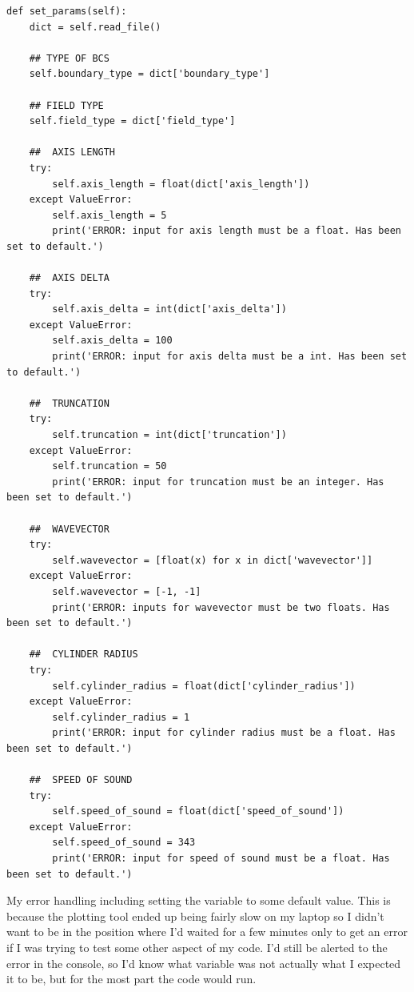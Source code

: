 \begin{lstlisting}
def set_params(self):
    dict = self.read_file()

    ## TYPE OF BCS
    self.boundary_type = dict['boundary_type']

    ## FIELD TYPE
    self.field_type = dict['field_type']

    ##  AXIS LENGTH
    try:
        self.axis_length = float(dict['axis_length'])
    except ValueError:
        self.axis_length = 5
        print('ERROR: input for axis length must be a float. Has been set to default.')

    ##  AXIS DELTA
    try:
        self.axis_delta = int(dict['axis_delta'])
    except ValueError:
        self.axis_delta = 100
        print('ERROR: input for axis delta must be a int. Has been set to default.')

    ##  TRUNCATION
    try:
        self.truncation = int(dict['truncation'])
    except ValueError:
        self.truncation = 50
        print('ERROR: input for truncation must be an integer. Has been set to default.')

    ##  WAVEVECTOR
    try:
        self.wavevector = [float(x) for x in dict['wavevector']]
    except ValueError:
        self.wavevector = [-1, -1]
        print('ERROR: inputs for wavevector must be two floats. Has been set to default.')

    ##  CYLINDER RADIUS
    try:
        self.cylinder_radius = float(dict['cylinder_radius'])
    except ValueError:
        self.cylinder_radius = 1
        print('ERROR: input for cylinder radius must be a float. Has been set to default.')

    ##  SPEED OF SOUND
    try:
        self.speed_of_sound = float(dict['speed_of_sound'])
    except ValueError:
        self.speed_of_sound = 343
        print('ERROR: input for speed of sound must be a float. Has been set to default.')
\end{lstlisting}

My error handling including setting the variable to some default value. This is because the plotting tool ended up being fairly slow on my laptop so I didn't want to be in the position where I'd waited for a few minutes only to get an error if I was trying to test some other aspect of my code. I'd still be alerted to the error in the console, so I'd know what variable was not actually what I expected it to be, but for the most part the code would run.

